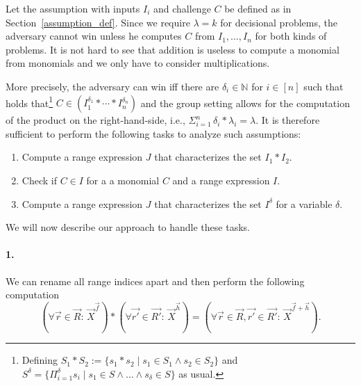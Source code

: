 %
%
Let the assumption with inputs $I_i$ and challenge $C$ be
  defined as in Section~\ref{assumption_def}.
Since we require $\lambda = k$ for decisional problems, the adversary
  cannot win unless he computes $C$ from $I_1,\ldots,I_n$ for both kinds of problems.
It is not hard to see that addition is useless to compute a monomial from monomials
  and we only have to consider multiplications.

More precisely, the adversary can win iff there are $\delta_i \in \mathbb{N}$ for $i \in [n]$
  such that holds that\footnote{
    Defining $S_1 * S_2 := \{ s_1 * s_2 \mid s_1 \in S_1 \land s_2 \in S_2\}$
    and $S^\delta = \{ \Pi_{i=1}^{\delta} s_i \mid s_1 \in S \land \ldots \land s_{\delta} \in S\}$
    as usual.
  }
$
  C \in (I_1^{\delta_1} * \cdots * I_n^{\delta_n})
$
  and the group setting allows for the computation of the product on the right-hand-side, i.e., 
$
  \Sigma_{i=1}^n\, \delta_i * \lambda_i = \lambda \text{.}
$
%
It is therefore sufficient to perform the following tasks to analyze such assumptions:
\begin{enumerate}
\item Compute a range expression $J$ that characterizes the set $I_1 * I_2$.
\item Check if $C \in I$ for a a monomial $C$ and a range expression $I$.
\item Compute a range expression $J$ that characterizes the set $I^\delta$ for a variable $\delta$.
\end{enumerate}
We will now describe our approach to handle these tasks.

\paragraph{1.}%
We can rename all range indices apart and then perform the following computation
$$
  (\forall \vec{r} \in \vec{R}:\, \vec{X}^{\vec{f}})
  *  (\forall \vec{r'} \in \vec{R'}:\, \vec{X}^{\vec{h}})
=
    (\forall \vec{r} \in \vec{R}, \vec{r'} \in \vec{R'}:\,
         \vec{X}^{\vec{f} + \vec{h}}) \text{.}
$$

